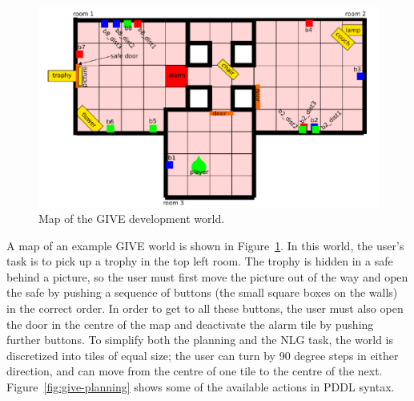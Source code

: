 \begin{figure}
\centering
\includegraphics[width=1 \columnwidth]{give_world_2}
\caption{Map of the GIVE development world.}
  \label{fig:give-development-world}
\end{figure}

A map of an example GIVE world is shown in
Figure~\ref{fig:give-development-world}.  In this world, the user's
task is to pick up a trophy in the top left room.  The trophy is
hidden in a safe behind a picture, so the user must first move the
picture out of the way and open the safe by pushing a sequence of
buttons (the small square boxes on the walls) in the correct order.
In order to get to all these buttons, the user must also open the door
in the centre of the map and deactivate the alarm tile by pushing
further buttons.  To simplify both the planning and the NLG task, the
world is discretized into tiles of equal size; the user can turn by 90
degree steps in either direction, and can move from the centre of one
tile to the centre of the next. Figure~\ref{fig:give-planning} shows
some of the available actions in PDDL syntax.

